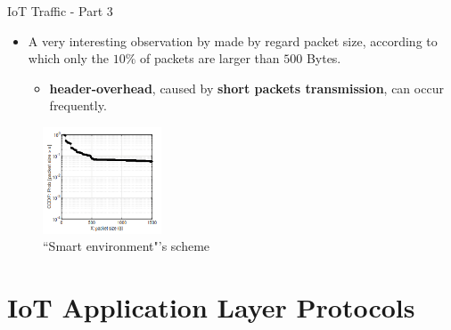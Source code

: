 \documentclass[10pt]{beamer}
\begin{document}
\begin{frame}{IoT Traffic - Part 3}

\begin{itemize}
\justifying
\item A very interesting observation by \citet{ITPAReport} made by regard packet size, according to which only the $10\%$ of packets are larger than $500$ Bytes.

\begin{itemize}
\item \textbf{header-overhead}, caused by \textbf{short packets transmission}, can occur frequently.
\end{itemize}

\end{itemize}

\begin{figure}
  \caption{``Smart environment"'s scheme}
  \includegraphics[width=100pt]{PacketSize.png}
\end{figure}

\end{frame} 
\section{IoT Application Layer Protocols}
\end{document}
